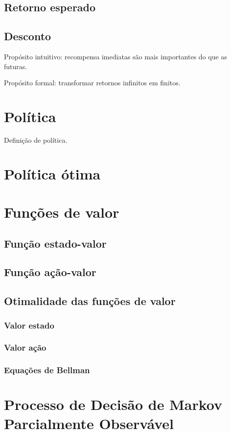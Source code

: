 \documentclass{article}
\begin{document}
    \subsection{Retorno esperado}
    
    \subsection{Desconto}
    
        Propósito intuitivo: recompensa imediatas são mais importantes do que as futuras.
        
        Propósito formal: transformar retornos infinitos em finitos.
    
\section{Política}

    Definição de política.

    \section{Política ótima}
    

\section{Funções de valor}
    
    \subsection{Função estado-valor}
    
    \subsection{Função ação-valor}
    
    \subsection{Otimalidade das funções de valor}
    
        \subsubsection{Valor estado}
        
        \subsubsection{Valor ação}
        
        \subsubsection{Equações de Bellman}
    
\section{Processo de Decisão de Markov Parcialmente Observável}
\end{document}
